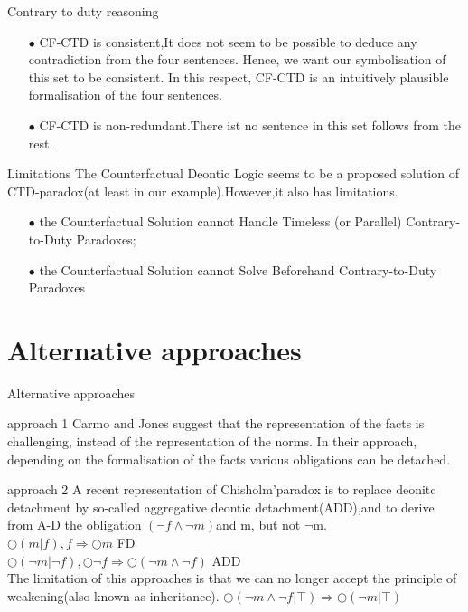 \documentclass{beamer}
\begin{document}
 \begin{frame}{Contrary to duty reasoning}
 \begin{enumerate}
\item[$\bullet$] CF-CTD is consistent,It does not seem to be possible to deduce any contradiction from the four sentences. Hence, we want our symbolisation of this set to be consistent. In this respect, CF-CTD is an intuitively plausible formalisation of the four sentences.
\item[$\bullet$] CF-CTD is non-redundant.There ist no sentence in this set follows from the rest.

\end{enumerate}    
\begin{block}{Limitations}
The Counterfactual Deontic Logic seems to be a proposed solution of CTD-paradox(at least in our example).However,it also has limitations.\\
\begin{enumerate}
\item[$\bullet$]the Counterfactual Solution cannot Handle Timeless (or Parallel)
Contrary-to-Duty Paradoxes;
\item[$\bullet$]the Counterfactual Solution cannot Solve Beforehand
Contrary-to-Duty Paradoxes
\end{enumerate}
\end{block}
\end{frame}
\section{Alternative approaches}
\begin{frame}{Alternative approaches}
\begin{block}{approach 1}
 Carmo and Jones suggest that the representation of the facts is challenging,
instead of the representation of the norms. In their approach, depending on the
formalisation of the facts various obligations can be detached.
\end{block}
\begin{block}{approach 2}
A recent representation of Chisholm'paradox is to replace deonitc detachment by so-called aggregative deontic detachment(ADD),and to derive from A-D the obligation  $(\neg f \wedge \neg m)$and m, but not $\neg $m.\\
$\bigcirc (m|f),f \Rightarrow \bigcirc m $ FD\\
$\bigcirc(\neg m |\neg f),\bigcirc\neg f \Rightarrow \bigcirc(\neg m \wedge \neg f)$ ADD\\
The limitation of this approaches is that we can no longer accept the principle of weakening(also known as inheritance). 
$\bigcirc(\neg m \wedge\neg f|\top) \Rightarrow \bigcirc(\neg m |\top)$
\end{block} 
\end{frame}
\end{document}
